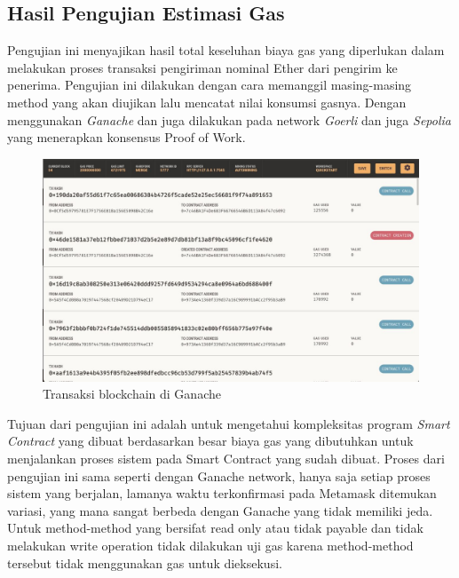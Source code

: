 \subsection{Hasil Pengujian Estimasi Gas}

Pengujian ini menyajikan hasil total keseluhan biaya gas yang diperlukan dalam melakukan proses transaksi pengiriman nominal Ether dari pengirim ke penerima.
Pengujian ini dilakukan dengan cara memanggil masing-masing method yang akan diujikan lalu mencatat nilai konsumsi gasnya.
Dengan menggunakan \emph{Ganache} dan juga dilakukan pada network \emph{Goerli} dan juga \emph{Sepolia} yang menerapkan konsensus Proof of Work.

\begin{figure}[H]
  \centering

  \includegraphics[scale=0.35]{gambar/ganache-uji-gas.jpg}

  \caption{Transaksi blockchain di Ganache}
  \label{fig:ganachegastest}
\end{figure}

Tujuan dari pengujian ini adalah untuk mengetahui kompleksitas program \emph{Smart Contract} yang dibuat berdasarkan besar biaya gas yang dibutuhkan untuk menjalankan proses sistem pada Smart Contract yang sudah dibuat.
Proses dari pengujian ini sama seperti dengan Ganache network, hanya saja setiap proses sistem yang berjalan, lamanya waktu terkonfirmasi pada Metamask ditemukan variasi, yang mana
sangat berbeda dengan Ganache yang tidak memiliki jeda. Untuk method-method yang bersifat read only atau tidak payable dan tidak melakukan write operation tidak dilakukan
uji gas karena method-method tersebut tidak menggunakan gas untuk dieksekusi.

